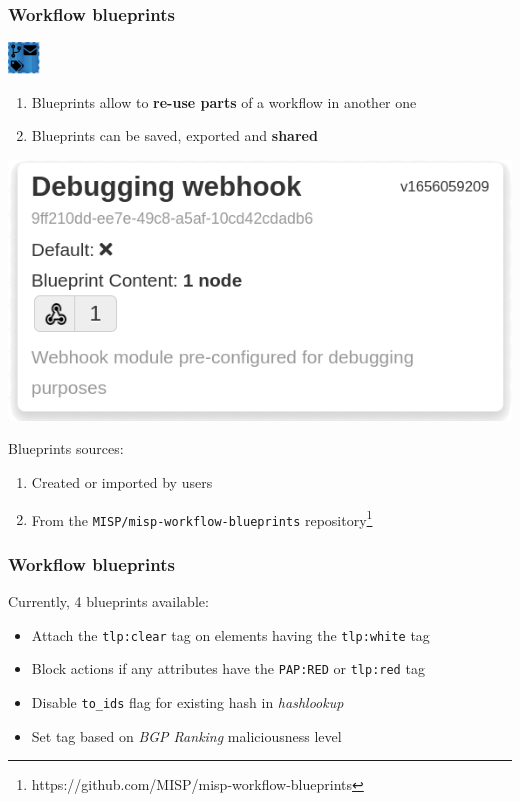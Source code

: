 \begin{frame}
    \frametitle{Workflow blueprints}
    \hspace*{0.9\textwidth}\includegraphics[width=32px]{pictures/blueprint-32.png}
    \vspace*{-2em}
    \begin{enumerate}
        \item Blueprints allow to \textbf{re-use parts} of a workflow in another one
        \item Blueprints can be saved, exported and \textbf{shared}
    \end{enumerate}
    \begin{center}
        \includegraphics[width=0.5\linewidth]{pictures/blueprint-debugging.png}
    \end{center}
    Blueprints sources:
    \begin{enumerate}
        \item Created or imported by users
        \item From the \texttt{MISP/misp-workflow-blueprints} repository\footnote{\scriptsize https://github.com/MISP/misp-workflow-blueprints}
    \end{enumerate}
\end{frame}

\begin{frame}
    \frametitle{Workflow blueprints}
    Currently, 4 blueprints available:
    \vspace*{1em}
    \begin{itemize}
        \item Attach the \texttt{tlp:clear} tag on elements having the \texttt{tlp:white} tag
        \item Block actions if any attributes have the \texttt{PAP:RED} or \texttt{tlp:red} tag
        \item Disable \texttt{to\_ids} flag for existing hash in \textit{hashlookup}
        \item Set tag based on \textit{BGP Ranking} maliciousness level
    \end{itemize}
\end{frame}


